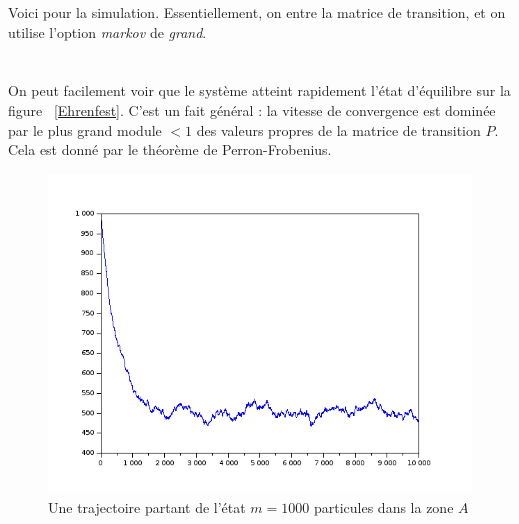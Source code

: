Voici pour la simulation. Essentiellement, on entre la matrice de transition, et on utilise l'option \textit{markov} de \textit{grand}.\\

\\
\\

On peut facilement voir que le système atteint rapidement l'état d'équilibre sur la figure ~\ref{Ehrenfest}. C'est un fait général : la vitesse de convergence est dominée par le plus grand module $<1$ des valeurs propres de la matrice de transition $P$. Cela est donné par le théorème de Perron-Frobenius.

\begin{figure}[h]\centering
\includegraphics[scale=0.4]{Ehrenfest.png}
\caption{Une trajectoire partant de l'état $m=1000$ particules dans la zone $A$}
\label{fig:Ehrenfest}
\end{figure}









